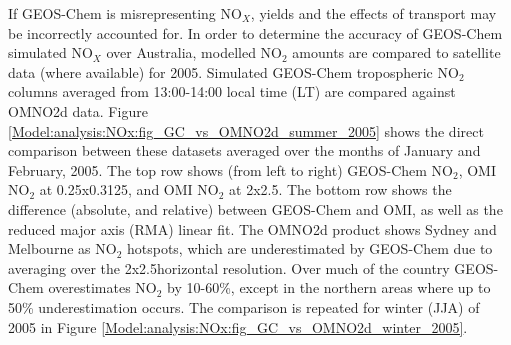     
    If GEOS-Chem is misrepresenting NO$_X$, yields and the effects of transport may be incorrectly accounted for.
    In order to determine the accuracy of GEOS-Chem simulated NO$_X$ over Australia, modelled NO$_2$ amounts are compared to satellite data (where available) for 2005.
    Simulated GEOS-Chem tropospheric NO$_2$ columns averaged from 13:00-14:00 local time (LT) are compared against OMNO2d data. %
    Figure \ref{Model:analysis:NOx:fig_GC_vs_OMNO2d_summer_2005} shows the direct comparison between these datasets averaged over the months of January and February, 2005.
    The top row shows (from left to right) GEOS-Chem NO$_2$, OMI NO$_2$ at 0.25x0.3125\degr, and OMI NO$_2$ at 2x2.5\degr.
    The bottom row shows the difference (absolute, and relative) between GEOS-Chem and OMI, as well as the reduced major axis (RMA) linear fit.
    The OMNO2d product shows Sydney and Melbourne as NO$_2$ hotspots, which are underestimated by GEOS-Chem due to averaging over the 2x2.5\degr horizontal resolution.
    Over much of the country GEOS-Chem overestimates NO$_2$ by 10-60\%, except in the northern areas where up to 50\% underestimation occurs.
    The comparison is repeated for winter (JJA) of 2005 in Figure \ref{Model:analysis:NOx:fig_GC_vs_OMNO2d_winter_2005}.
    
      
      
